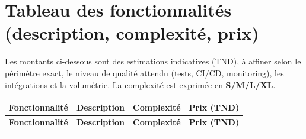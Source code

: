 \documentclass[12pt, a4paper]{article}
\begin{document}
\section{Tableau des fonctionnalités (description, complexité, prix)}
Les montants ci-dessous sont des estimations indicatives (TND), à affiner selon le périmètre exact, le niveau de qualité attendu (tests, CI/CD, monitoring), les intégrations et la volumétrie. La complexité est exprimée en \textbf{S/M/L/XL}.

\begin{longtable}{|p{4.2cm}|p{8.2cm}|p{1.6cm}|p{2.0cm}|}
\hline
\textbf{Fonctionnalité} & \textbf{Description} & \textbf{Complexité} & \textbf{Prix (TND)} \\
\hline
\endfirsthead
\hline
\textbf{Fonctionnalité} & \textbf{Description} & \textbf{Complexité} & \textbf{Prix (TND)} \\
\hline
\endhead
\hline
\endfoot
\hline
\endlastfoot


\end{longtable}
\end{document}
